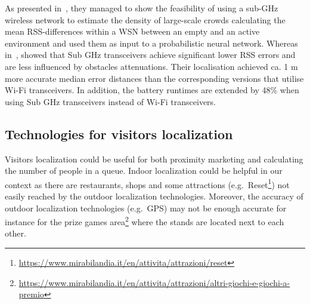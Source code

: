 As presented in~\cite{denis2018large}, they managed to show the feasibility of using a sub-GHz wireless network to estimate the density of
large-scale crowds calculating the mean RSS-differences within a WSN between an empty and an active environment and used them as input to a
probabilistic neural network. Whereas in~\cite{fudickar2014comparing}, showed that Sub GHz transceivers achieve significant lower RSS errors and are
less influenced by obstacles attenuations. Their localisation achieved ca. 1 m more accurate median error distances than the corresponding versions
that utilise Wi-Fi transceivers. In addition, the battery runtimes are extended by 48\% when using Sub GHz transceivers instead of Wi-Fi
transceivers.

\subsection{Technologies for visitors localization}\label{sec:technologies}
Visitors localization could be useful for both proximity marketing and calculating the number of people in a queue. Indoor localization could be
helpful in our context as there are restaurants, shops and some attractions (e.g.\
Reset\footnote{\url{https://www.mirabilandia.it/en/attivita/attrazioni/reset}}) not easily reached by the outdoor localization technologies.
Moreover, the accuracy of outdoor localization technologies (e.g.\ GPS) may not be enough accurate for instance for the prize games
area\footnote{\url{https://www.mirabilandia.it/en/attivita/attrazioni/altri-giochi-e-giochi-a-premio}} where the stands are located next to each
other.



